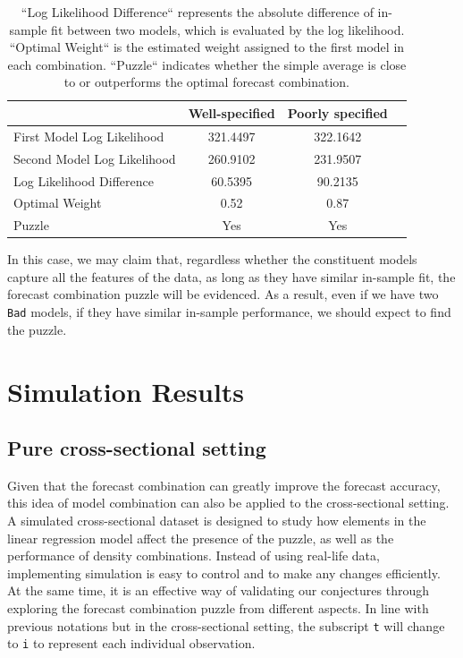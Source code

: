 \documentclass{monashthesis}
\begin{document}
\begin{table}[ht]
  \centering
    \begin{tabular}{l|ccc}
    \toprule
                                      &   Well-specified   &   Poorly specified  \\  
    \midrule
    First Model Log Likelihood        &     321.4497       &        322.1642     \\
    Second Model Log Likelihood       &     260.9102       &        231.9507     \\
    Log Likelihood Difference         &     60.5395        &        90.2135      \\
    Optimal Weight                    &       0.52         &          0.87       \\
    Puzzle                            &       Yes          &          Yes        \\
    \bottomrule
    \end{tabular}
  \caption{``Log Likelihood Difference`` represents the absolute difference of in-sample fit between two models, which is evaluated by the log likelihood. ``Optimal Weight`` is the estimated weight assigned to the first model in each combination. ``Puzzle`` indicates whether the simple average is close to or outperforms the optimal forecast combination.}
  \label{tab:season}
\end{table}

In this case, we may claim that, regardless whether the constituent models capture all the features of the data, as long as they have similar in-sample fit, the forecast combination puzzle will be evidenced. As a result, even if we have two \texttt{Bad} models, if they have similar in-sample performance, we should expect to find the puzzle.

\hypertarget{simulation-results}{%
\chapter{Simulation Results}\label{simulation-results}}

\hypertarget{pure-cross-sectional-setting}{%
\section{Pure cross-sectional setting}\label{pure-cross-sectional-setting}}

Given that the forecast combination can greatly improve the forecast accuracy, this idea of model combination can also be applied to the cross-sectional setting. A simulated cross-sectional dataset is designed to study how elements in the linear regression model affect the presence of the puzzle, as well as the performance of density combinations. Instead of using real-life data, implementing simulation is easy to control and to make any changes efficiently. At the same time, it is an effective way of validating our conjectures through exploring the forecast combination puzzle from different aspects. In line with previous notations but in the cross-sectional setting, the subscript \texttt{t} will change to \texttt{i} to represent each individual observation.
\end{document}

